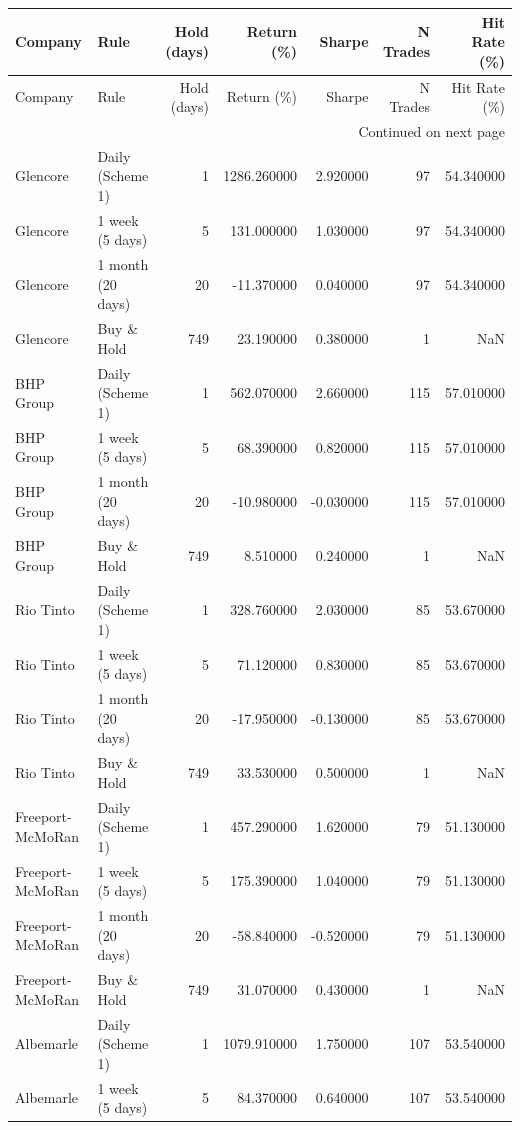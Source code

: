 \begin{longtable}{llrrrrr}
\toprule
Company & Rule & Hold (days) & Return (\%) & Sharpe & N Trades & Hit Rate (\%) \\
\midrule
\endfirsthead
\toprule
Company & Rule & Hold (days) & Return (\%) & Sharpe & N Trades & Hit Rate (\%) \\
\midrule
\endhead
\midrule
\multicolumn{7}{r}{Continued on next page} \\
\midrule
\endfoot
\bottomrule
\endlastfoot
Glencore & Daily (Scheme 1) & 1 & 1286.260000 & 2.920000 & 97 & 54.340000 \\
Glencore & 1 week (5 days) & 5 & 131.000000 & 1.030000 & 97 & 54.340000 \\
Glencore & 1 month (20 days) & 20 & -11.370000 & 0.040000 & 97 & 54.340000 \\
Glencore & Buy \& Hold & 749 & 23.190000 & 0.380000 & 1 & NaN \\
BHP Group & Daily (Scheme 1) & 1 & 562.070000 & 2.660000 & 115 & 57.010000 \\
BHP Group & 1 week (5 days) & 5 & 68.390000 & 0.820000 & 115 & 57.010000 \\
BHP Group & 1 month (20 days) & 20 & -10.980000 & -0.030000 & 115 & 57.010000 \\
BHP Group & Buy \& Hold & 749 & 8.510000 & 0.240000 & 1 & NaN \\
Rio Tinto & Daily (Scheme 1) & 1 & 328.760000 & 2.030000 & 85 & 53.670000 \\
Rio Tinto & 1 week (5 days) & 5 & 71.120000 & 0.830000 & 85 & 53.670000 \\
Rio Tinto & 1 month (20 days) & 20 & -17.950000 & -0.130000 & 85 & 53.670000 \\
Rio Tinto & Buy \& Hold & 749 & 33.530000 & 0.500000 & 1 & NaN \\
Freeport-McMoRan & Daily (Scheme 1) & 1 & 457.290000 & 1.620000 & 79 & 51.130000 \\
Freeport-McMoRan & 1 week (5 days) & 5 & 175.390000 & 1.040000 & 79 & 51.130000 \\
Freeport-McMoRan & 1 month (20 days) & 20 & -58.840000 & -0.520000 & 79 & 51.130000 \\
Freeport-McMoRan & Buy \& Hold & 749 & 31.070000 & 0.430000 & 1 & NaN \\
Albemarle & Daily (Scheme 1) & 1 & 1079.910000 & 1.750000 & 107 & 53.540000 \\
Albemarle & 1 week (5 days) & 5 & 84.370000 & 0.640000 & 107 & 53.540000 \\

\end{longtable}
